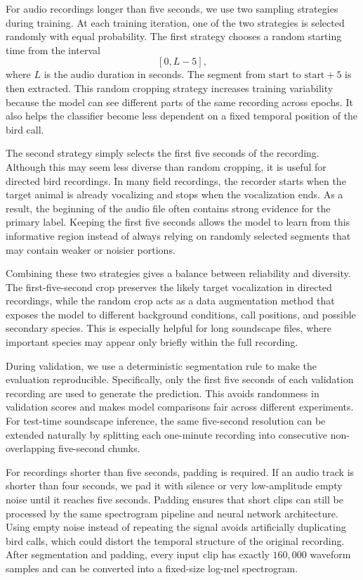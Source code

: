 \documentclass[a4paper,12pt]{article}
\begin{document}
For audio recordings longer than five seconds, we use two sampling strategies during training. At each training iteration, one of the two strategies is selected randomly with equal probability. The first strategy chooses a random starting time from the interval
\[
[0, L - 5],
\]
where $L$ is the audio duration in seconds. The segment from $\text{start}$ to $\text{start}+5$ is then extracted. This random cropping strategy increases training variability because the model can see different parts of the same recording across epochs. It also helps the classifier become less dependent on a fixed temporal position of the bird call.

The second strategy simply selects the first five seconds of the recording. Although this may seem less diverse than random cropping, it is useful for directed bird recordings. In many field recordings, the recorder starts when the target animal is already vocalizing and stops when the vocalization ends. As a result, the beginning of the audio file often contains strong evidence for the primary label. Keeping the first five seconds allows the model to learn from this informative region instead of always relying on randomly selected segments that may contain weaker or noisier portions.

Combining these two strategies gives a balance between reliability and diversity. The first-five-second crop preserves the likely target vocalization in directed recordings, while the random crop acts as a data augmentation method that exposes the model to different background conditions, call positions, and possible secondary species. This is especially helpful for long soundscape files, where important species may appear only briefly within the full recording.

During validation, we use a deterministic segmentation rule to make the evaluation reproducible. Specifically, only the first five seconds of each validation recording are used to generate the prediction. This avoids randomness in validation scores and makes model comparisons fair across different experiments. For test-time soundscape inference, the same five-second resolution can be extended naturally by splitting each one-minute recording into consecutive non-overlapping five-second chunks.

For recordings shorter than five seconds, padding is required. If an audio track is shorter than four seconds, we pad it with silence or very low-amplitude empty noise until it reaches five seconds. Padding ensures that short clips can still be processed by the same spectrogram pipeline and neural network architecture. Using empty noise instead of repeating the signal avoids artificially duplicating bird calls, which could distort the temporal structure of the original recording.
After segmentation and padding, every input clip has exactly $160{,}000$ waveform samples and can be converted into a fixed-size log-mel spectrogram.
\end{document}

